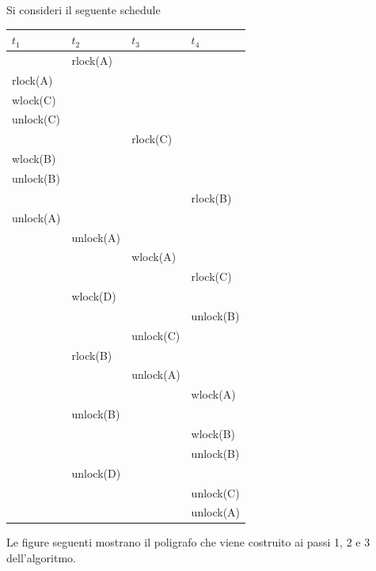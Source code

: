 Si consideri il seguente schedule
\begin{center}
 \begin{longtable}{|l|l|l|l|}
  \hline
  $t_1$ & $t_2$ & $t_3$ & $t_4$\\
  \hline
  & rlock(A) & & \\
  rlock(A) & & & \\
  wlock(C) & & & \\
  unlock(C) & & & \\
  & & rlock(C) & \\
  wlock(B) & & & \\
  unlock(B)& & & \\
  & & & rlock(B)\\
  unlock(A) & & & \\
  & unlock(A)& &\\
  & & wlock(A)& \\
  & & & rlock(C)\\
  & wlock(D) & & \\
 & & & unlock(B)\\
  & &unlock(C)&\\
 & rlock(B) & & \\
  & & unlock(A)& \\
 & & & wlock(A)\\
 & unlock(B)& &\\
 & & & wlock(B)\\
 & & & unlock(B)\\
 & unlock(D) & &\\
   & & &unlock(C)\\
 & & & unlock(A)\\
\hline
 \end{longtable}
\end{center}
Le figure seguenti mostrano il poligrafo che viene costruito ai passi 1, 2 e 3 dell'algoritmo.
